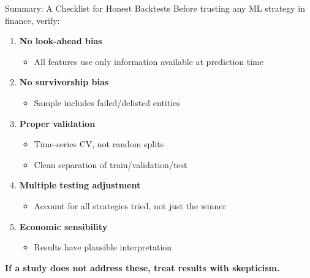 \documentclass[10pt]{beamer}
\newcommand{\highlight}[1]{\textcolor{AccentOrange}{\textbf{#1}}}
\begin{document}
\begin{frame}{Summary: A Checklist for Honest Backtests}
  Before trusting any ML strategy in finance, verify:
  
  \vspace{0.5em}
  \begin{enumerate}
    \item[\checkmark] \textbf{No look-ahead bias}
    \begin{itemize}
      \item All features use only information available at prediction time
    \end{itemize}
    \vspace{0.3em}
    \item[\checkmark] \textbf{No survivorship bias}
    \begin{itemize}
      \item Sample includes failed/delisted entities
    \end{itemize}
    \vspace{0.3em}
    \item[\checkmark] \textbf{Proper validation}
    \begin{itemize}
      \item Time-series CV, not random splits
      \item Clean separation of train/validation/test
    \end{itemize}
    \vspace{0.3em}
    \item[\checkmark] \textbf{Multiple testing adjustment}
    \begin{itemize}
      \item Account for all strategies tried, not just the winner
    \end{itemize}
    \vspace{0.3em}
    \item[\checkmark] \textbf{Economic sensibility}
    \begin{itemize}
      \item Results have plausible interpretation
    \end{itemize}
  \end{enumerate}
  
  \vspace{0.5em}
  \highlight{If a study does not address these, treat results with skepticism.}
\end{frame}

\end{document}
